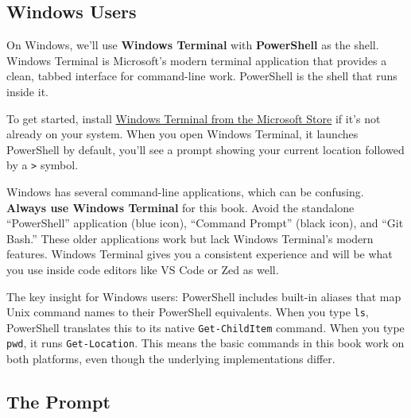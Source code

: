 \documentclass[
  letterpaper,
  DIV=11,
  numbers=noendperiod]{scrreprt}
\begin{document}
\subsection{Windows Users}\label{windows-users}

On Windows, we'll use \textbf{Windows Terminal} with \textbf{PowerShell}
as the shell. Windows Terminal is Microsoft's modern terminal
application that provides a clean, tabbed interface for command-line
work. PowerShell is the shell that runs inside it.

To get started, install \href{https://aka.ms/terminal}{Windows Terminal
from the Microsoft Store} if it's not already on your system. When you
open Windows Terminal, it launches PowerShell by default, you'll see a
prompt showing your current location followed by a
\texttt{\textgreater{}} symbol.

\begin{tcolorbox}[enhanced jigsaw, opacitybacktitle=0.6, arc=.35mm, colback=white, bottomtitle=1mm, opacityback=0, toprule=.15mm, left=2mm, colbacktitle=quarto-callout-important-color!10!white, breakable, coltitle=black, toptitle=1mm, colframe=quarto-callout-important-color-frame, bottomrule=.15mm, titlerule=0mm, title=\textcolor{quarto-callout-important-color}{\faExclamation}\hspace{0.5em}{Use Windows Terminal, Not the Legacy Apps}, rightrule=.15mm, leftrule=.75mm]

Windows has several command-line applications, which can be confusing.
\textbf{Always use Windows Terminal} for this book. Avoid the standalone
``PowerShell'' application (blue icon), ``Command Prompt'' (black icon),
and ``Git Bash.'' These older applications work but lack Windows
Terminal's modern features. Windows Terminal gives you a consistent
experience and will be what you use inside code editors like VS Code or
Zed as well.

\end{tcolorbox}

The key insight for Windows users: PowerShell includes built-in aliases
that map Unix command names to their PowerShell equivalents. When you
type \texttt{ls}, PowerShell translates this to its native
\texttt{Get-ChildItem} command. When you type \texttt{pwd}, it runs
\texttt{Get-Location}. This means the basic commands in this book work
on both platforms, even though the underlying implementations differ.

\subsection{The Prompt}\label{the-prompt}
\end{document}
